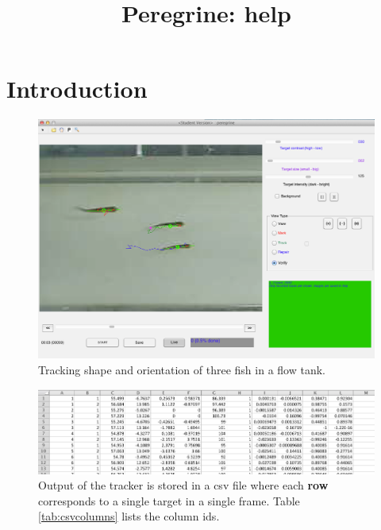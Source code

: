 \documentclass[11pt]{article}
\title{Peregrine: help}
\author{}
\date{}
\begin{document}
\maketitle
\tableofcontents
\newpage
\thispagestyle{empty}
\pagestyle{empty}


\section{Introduction}
\begin{figure}[ht]
\centering
\includegraphics[width=.995\linewidth]{screenshot}
\caption{Tracking shape and orientation of three fish in a flow tank.}
\label{fig:sample_tracks}
\end{figure}

\begin{figure}[ht]
\centering
\includegraphics[width=.995\linewidth]{output}
\caption{Output of the tracker is stored in a csv file where each \textbf{row} corresponds to a single target in a single frame. Table \ref{tab:csvcolumns} lists the column ids. }
\label{fig:output}
\end{figure}
\end{document}
